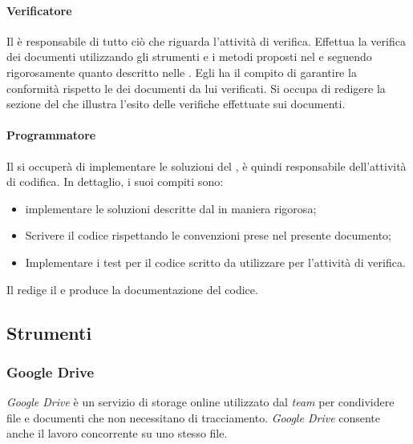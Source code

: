 \paragraph{Verificatore}
Il \textit{\Ver} è responsabile di tutto ciò che riguarda l'attività di verifica.
Effettua la verifica dei documenti utilizzando gli strumenti e i metodi proposti nel
\textit{\PdQ} e seguendo rigorosamente quanto descritto nelle \textit{\NdP}.
Egli ha il compito di garantire la conformità rispetto le \textit{\NdP} dei documenti da lui verificati.
Si occupa di redigere la sezione del \textit{\PdQ} che illustra l'esito delle
verifiche effettuate sui documenti.

\paragraph{Programmatore}
Il \textit{\Progr} si occuperà di implementare le soluzioni del \textit{\Prog}, è quindi
responsabile dell'attività di codifica. In dettaglio, i suoi compiti sono:
\begin{itemize}
  \item implementare le soluzioni descritte dal \textit{\Prog} in maniera
  rigorosa;
  \item Scrivere il codice rispettando le convenzioni prese nel presente
  documento;
  \item Implementare i test per il codice scritto da utilizzare per l'attività
  di verifica.
\end{itemize}
Il \textit{\Progr} redige il \textit{\MU} e produce la documentazione del codice.

\subsection{Strumenti}

\subsubsection{Google Drive}
\textit{Google Drive} è un servizio di storage online utilizzato dal
\textit{team} per condividere file e documenti che non necessitano di tracciamento.
\textit{Google Drive} consente anche il lavoro concorrente su uno stesso
file.
